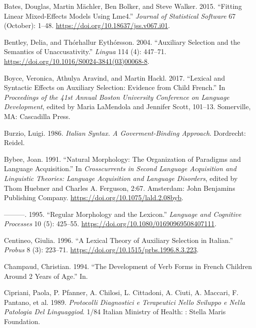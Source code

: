 \documentclass[
  12pt,
]{article}
\newlength{\cslhangindent}
\newlength{\cslentryspacingunit} %
\newenvironment{CSLReferences}[2] %
 {%
  \setlength{\parindent}{0pt}
  \ifodd #1
  \let\oldpar\par
  \def\par{\hangindent=\cslhangindent\oldpar}
  \fi
  \setlength{\parskip}{#2\cslentryspacingunit}
 }%
 {}
\begin{document}
\begin{enumerate}[resume*]
\begin{enumerate}[resume*]
\begin{enumerate}[resume*]
\begin{enumerate}[resume*]
\begin{enumerate}[resume*]
\begin{CSLReferences}{1}{0}
\leavevmode{}%
Bates, Douglas, Martin Mächler, Ben Bolker, and Steve Walker. 2015. {``Fitting {Linear} {Mixed}-{Effects} {Models} {Using} Lme4.''} \emph{Journal of Statistical Software} 67 (October): 1--48. \url{https://doi.org/10.18637/jss.v067.i01}.

\leavevmode{}%
Bentley, Delia, and Thórhallur Eythórsson. 2004. {``Auxiliary Selection and the Semantics of Unaccusativity.''} \emph{Lingua} 114 (4): 447--71. \url{https://doi.org/10.1016/S0024-3841(03)00068-8}.

\leavevmode{}%
Boyce, Veronica, Athulya Aravind, and Martin Hackl. 2017. {``Lexical and {Syntactic} {Effects} on {Auxiliary} {Selection}: {Evidence} from {Child} {French}.''} In \emph{Proceedings of the 41st Annual {Boston} {University} {Conference} on {Language} {Development}}, edited by Maria LaMendola and Jennifer Scott, 101--13. Somerville, MA: Cascadilla Press.

\leavevmode{}%
Burzio, Luigi. 1986. \emph{Italian {Syntax}. {A} {Goverment}-{Binding} {Approach}}. Dordrecht: Reidel.

\leavevmode{}%
Bybee, Joan. 1991. {``Natural Morphology: The Organization of Paradigms and Language Acquisition.''} In \emph{Crosscurrents in {Second} {Language} {Acquisition} and {Linguistic} {Theories}: {Language} {Acquisition} and {Language} {Disorders}}, edited by Thom Huebner and Charles A. Ferguson, 2:67. Amsterdam: John Benjamins Publishing Company. \url{https://doi.org/10.1075/lald.2.08byb}.

\leavevmode{}%
---------. 1995. {``Regular Morphology and the Lexicon.''} \emph{Language and Cognitive Processes} 10 (5): 425--55. \url{https://doi.org/10.1080/01690969508407111}.

\leavevmode{}%
Centineo, Giulia. 1996. {``A Lexical Theory of Auxiliary Selection in {Italian}.''} \emph{Probus} 8 (3): 223--71. \url{https://doi.org/10.1515/prbs.1996.8.3.223}.

\leavevmode{}%
Champaud, Christian. 1994. {``The Development of Verb Forms in {French} Children Around 2 Years of Age.''} In.

\leavevmode{}%
Cipriani, Paola, P. Pfanner, A. Chilosi, L. Cittadoni, A. Ciuti, A. Maccari, F. Pantano, et al. 1989. \emph{Protocolli Diagnostici e Terapeutici Nello Sviluppo e Nella Patologia Del Linguaggiod}. 1/84 Italian Ministry of Health: : Stella Maris Foundation.


\end{CSLReferences}
\end{enumerate}
\end{enumerate}
\end{enumerate}
\end{enumerate}
\end{enumerate}
\end{document}
